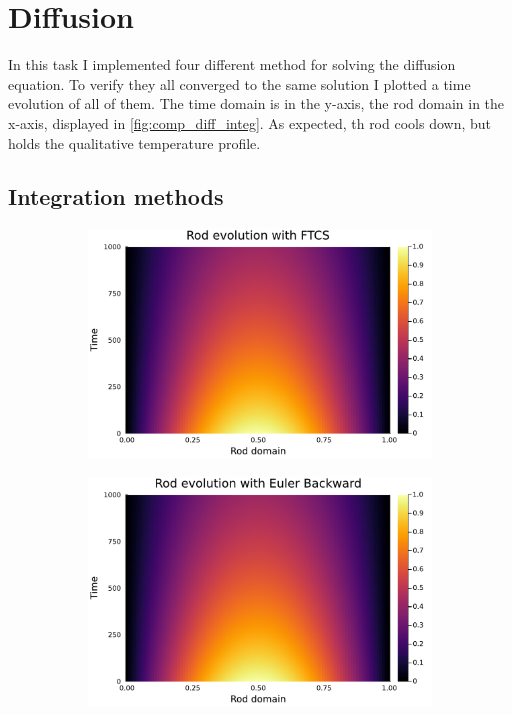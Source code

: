 \documentclass[
	a4paper, %
	10pt, %
]{CSUniSchoolLabReport}
\begin{document}
\section{Diffusion}

In this task I implemented four different method for solving the diffusion equation. To verify they all converged to the same solution I plotted a time evolution of all of them. The time domain is in the y-axis, the rod domain in the x-axis, displayed in \autoref{fig:comp_diff_integ}. As expected, th rod cools down, but holds the qualitative temperature profile.

\subsection{Integration methods}

\begin{figure}[H]
	\centering
	\begin{subfigure}[b]{0.49\textwidth}
		\includegraphics[width=\textwidth]{../saves_t2/rod_FTCS.pdf}
	\end{subfigure}
	\hfill
	\begin{subfigure}[b]{0.49\textwidth}
		\includegraphics[width=\textwidth]{../saves_t2/rod_euler_back.pdf}

\end{subfigure}
\end{figure}
\end{document}
